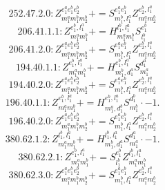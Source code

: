\documentclass[letterpaper,10pt,fleqn,leqno,onecolumn]{article}
\begin{document}
\begin{equation} \;\;\;\;\;\;  252.47.2.0: Z^{e_{1}^{a}e_{1}^{b}e_{2}^{b}}_{m_{1}^{a}m_{1}^{b}m_{2}^{b}}+=S^{e_{1}^{a}e_{1}^{b}}_{m_{1}^{b},l_{1}^{a}}Z^{e_{2}^{b},l_{1}^{a}}_{m_{1}^{a}m_{2}^{b}} \end{equation}
\begin{equation} \;\;\;\;\;\;  206.41.1.1: Z^{e_{1}^{b},l_{1}^{a}}_{m_{1}^{a}m_{1}^{b}}+=H^{l_{1}^{b},l_{1}^{a}}_{m_{1}^{a}m_{1}^{b}}S^{e_{1}^{b}}_{l_{1}^{b}} \end{equation}
\begin{equation} \;\;\;\;\;\;  206.41.2.0: Z^{e_{1}^{a}e_{1}^{b}e_{2}^{b}}_{m_{1}^{a}m_{1}^{b}m_{2}^{b}}+=S^{e_{1}^{a}e_{1}^{b}}_{m_{1}^{b},l_{1}^{a}}Z^{e_{2}^{b},l_{1}^{a}}_{m_{1}^{a}m_{2}^{b}} \end{equation}
\begin{equation} \;\;\;\;\;\;  194.40.1.1: Z^{e_{1}^{b},l_{1}^{a}}_{m_{1}^{a}m_{1}^{b}}+=H^{e_{1}^{b},l_{1}^{a}}_{m_{1}^{b},d_{1}^{a}}S^{d_{1}^{a}}_{m_{1}^{a}} \end{equation}
\begin{equation} \;\;\;\;\;\;  194.40.2.0: Z^{e_{1}^{a}e_{1}^{b}e_{2}^{b}}_{m_{1}^{a}m_{1}^{b}m_{2}^{b}}+=S^{e_{1}^{a}e_{1}^{b}}_{m_{1}^{b},l_{1}^{a}}Z^{e_{2}^{b},l_{1}^{a}}_{m_{1}^{a}m_{2}^{b}} \end{equation}
\begin{equation} \;\;\;\;\;\;  196.40.1.1: Z^{e_{1}^{b},l_{1}^{a}}_{m_{1}^{a}m_{1}^{b}}+=H^{e_{1}^{b},l_{1}^{a}}_{m_{1}^{a},d_{1}^{b}}S^{d_{1}^{b}}_{m_{1}^{b}}\cdot -1. \end{equation}
\begin{equation} \;\;\;\;\;\;  196.40.2.0: Z^{e_{1}^{a}e_{1}^{b}e_{2}^{b}}_{m_{1}^{a}m_{1}^{b}m_{2}^{b}}+=S^{e_{1}^{a}e_{1}^{b}}_{m_{1}^{b},l_{1}^{a}}Z^{e_{2}^{b},l_{1}^{a}}_{m_{1}^{a}m_{2}^{b}} \end{equation}
\begin{equation} \;\;\;\;\;\;  380.62.1.2: Z^{l_{1}^{b},l_{1}^{a}}_{m_{1}^{a}m_{1}^{b}}+=H^{l_{1}^{b},l_{1}^{a}}_{m_{1}^{b},d_{1}^{a}}S^{d_{1}^{a}}_{m_{1}^{a}}\cdot -1. \end{equation}
\begin{equation} \;\;\;\;\;\;  380.62.2.1: Z^{e_{1}^{b},l_{1}^{a}}_{m_{1}^{a}m_{1}^{b}}+=S^{e_{1}^{b}}_{l_{1}^{b}}Z^{l_{1}^{b},l_{1}^{a}}_{m_{1}^{a}m_{1}^{b}} \end{equation}
\begin{equation} \;\;\;\;\;\;  380.62.3.0: Z^{e_{1}^{a}e_{1}^{b}e_{2}^{b}}_{m_{1}^{a}m_{1}^{b}m_{2}^{b}}+=S^{e_{1}^{a}e_{1}^{b}}_{m_{1}^{b},l_{1}^{a}}Z^{e_{2}^{b},l_{1}^{a}}_{m_{1}^{a}m_{2}^{b}} \end{equation}
\end{document}
